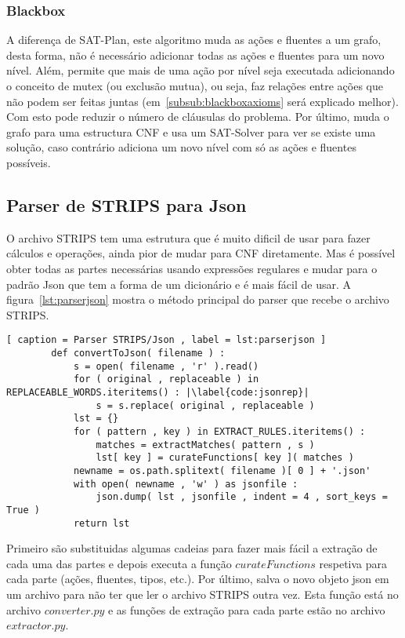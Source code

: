 	\subsubsection{Blackbox}
	\label{subsub:blackbox}
		A diferença de SAT-Plan, este algoritmo muda as ações e fluentes a um grafo, desta forma, não é necessário adicionar todas as ações e fluentes para um novo nível. Além, permite que mais de uma ação por nível seja executada adicionando o conceito de mutex (ou exclusão mutua), ou seja, faz relações entre ações que não podem ser feitas juntas (em~\ref{subsub:blackboxaxioms} será explicado melhor). Com esto pode reduzir o número de cláusulas do problema. Por último, muda o grafo para uma estructura CNF e usa um SAT-Solver para ver se existe uma solução, caso contrário adiciona um novo nível com só as ações e fluentes possíveis.

\subsection{Parser de STRIPS para Json}
\label{subsec:stripsjson}
	O archivo STRIPS tem uma estrutura que é muito dificil de usar para fazer cálculos e operações, ainda pior de mudar para CNF diretamente. Mas é possível obter todas as partes necessárias usando expressões regulares e mudar para o padrão Json que tem a forma de um dicionário e é mais fácil de usar. A figura~\ref{lst:parserjson} mostra o método principal do parser que recebe o archivo STRIPS.
	\renewcommand \lstlistingname{Código}
	\begin{lstlisting}[ caption = Parser STRIPS/Json , label = lst:parserjson ]
		def convertToJson( filename ) :
			s = open( filename , 'r' ).read()
			for ( original , replaceable ) in REPLACEABLE_WORDS.iteritems() : |\label{code:jsonrep}|
				s = s.replace( original , replaceable )
			lst = {}
			for ( pattern , key ) in EXTRACT_RULES.iteritems() :
				matches = extractMatches( pattern , s )
				lst[ key ] = curateFunctions[ key ]( matches )
			newname = os.path.splitext( filename )[ 0 ] + '.json'
			with open( newname , 'w' ) as jsonfile :
				json.dump( lst , jsonfile , indent = 4 , sort_keys = True )
			return lst
	\end{lstlisting}
	Primeiro são substituidas algumas cadeias para fazer mais fácil a extração de cada uma das partes e depois executa a função $curateFunctions$ respetiva para cada parte (ações, fluentes, tipos, etc.). Por último, salva o novo objeto json em um archivo para não ter que ler o archivo STRIPS outra vez. Esta função está no archivo ${converter.py}$ e as funções de extração para cada parte estão no archivo ${extractor.py}$.

